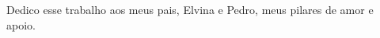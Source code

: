 \begin{dedicatoria}
  \vspace*{\fill}
  \hspace*{\fill}\parbox[b]{.5\textwidth}{%
    \linespread{1}\selectfont
    Dedico esse trabalho aos meus pais, Elvina e Pedro, meus pilares de amor e apoio.
  }
\end{dedicatoria}